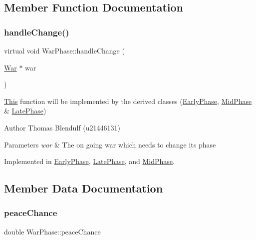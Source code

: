 \subsection{Member Function Documentation}
\mbox{\label{class_war_phase_a258e9480c7b3dcbdebdf86863659f1e5}} 
\subsubsection{\texorpdfstring{handleChange()}{handleChange()}}
{\footnotesize\ttfamily virtual void War\+Phase\+::handle\+Change (\begin{DoxyParamCaption}\item[{\mbox{\hyperlink{class_war}{War}} $\ast$}]{war }\end{DoxyParamCaption})\hspace{0.3cm}{\ttfamily [pure virtual]}}



\mbox{\hyperlink{class_this}{This}} function will be implemented by the derived classes (\mbox{\hyperlink{class_early_phase}{Early\+Phase}}, \mbox{\hyperlink{class_mid_phase}{Mid\+Phase}} \& \mbox{\hyperlink{class_late_phase}{Late\+Phase}}) 

\begin{DoxyAuthor}{Author}
Thomas Blendulf (u21446131) 
\end{DoxyAuthor}

\begin{DoxyParams}{Parameters}
{\em war} & The on going war which needs to change its phase \\
\hline
\end{DoxyParams}


Implemented in \mbox{\hyperlink{class_early_phase_a2f5485add7def09e0ec0538c552c88d8}{Early\+Phase}}, \mbox{\hyperlink{class_late_phase_afe61bf1d21b6534b674ce730cbdcd722}{Late\+Phase}}, and \mbox{\hyperlink{class_mid_phase_a7127c09e9eb9a19bb2973025760b67e8}{Mid\+Phase}}.



\subsection{Member Data Documentation}
\mbox{\label{class_war_phase_aa476ee98bb8f92df4d2e2f5b2ce4abca}} 
\subsubsection{\texorpdfstring{peaceChance}{peaceChance}}
{\footnotesize\ttfamily double War\+Phase\+::peace\+Chance}

